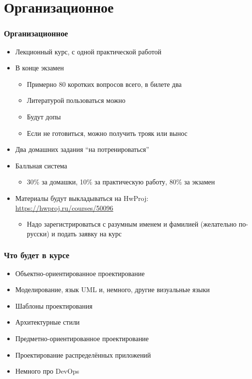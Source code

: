 \documentclass{../../slides-style}
\begin{document}
    \begin{frame}[plain]
        \titlepage
    \end{frame}

    \section{Организационное}

    \begin{frame}
        \frametitle{Организационное}
        \begin{itemize}
            \item Лекционный курс, с одной практической работой
            \item В конце экзамен
            \begin{itemize}
                \item Примерно 80 коротких вопросов всего, в билете два
                \item Литературой пользоваться можно
                \item Будут допы
                \item Если не готовиться, можно получить трояк или вынос
            \end{itemize}
            \item Два домашних задания \enquote{на потренироваться}
            \item Балльная система
            \begin{itemize}
                \item 30\% за домашки, 10\% за практическую работу, 80\% за экзамен
            \end{itemize}
            \item Материалы будут выкладываться на HwProj: \url{https://hwproj.ru/courses/50096}
            \begin{itemize}
                \item Надо зарегистрироваться с разумным именем и фамилией (желательно по-русски) и подать заявку на курс
            \end{itemize}
        \end{itemize}
    \end{frame}

    \begin{frame}
        \frametitle{Что будет в курсе}
        \begin{itemize}
            \item Объектно-ориентированное проектирование
            \item Моделирование, язык UML и, немного, другие визуальные языки
            \item Шаблоны проектирования
            \item Архитектурные стили
            \item Предметно-ориентированное проектирование
            \item Проектирование распределённых приложений
            \item Немного про DevOps
        \end{itemize}
    \end{frame}
\end{document}
